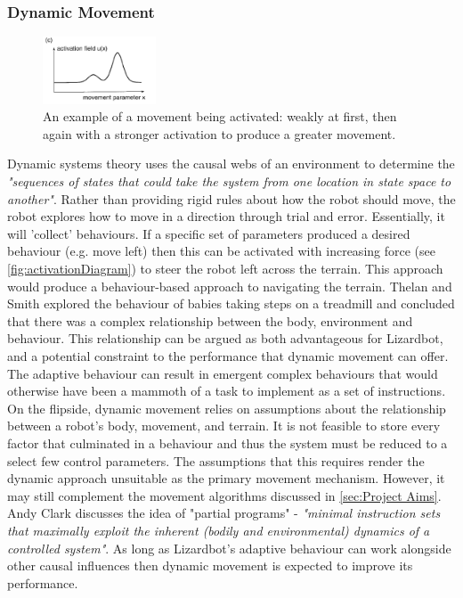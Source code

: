 \documentclass{article}
\begin{document}
\subsubsection{Dynamic Movement}
\label{sec:DST Aims}
\begin{figure}
    \centering
    \vspace*{-5mm}
    \includegraphics[width=0.3\textwidth]{activationExample}
    \caption{An example of a movement being activated: weakly at first, then again with a stronger activation to produce a greater movement. \citep{dft}}
    \label{fig:activationDiagram}
\end{figure}
Dynamic systems theory uses the causal webs of an environment to determine the \textit{"sequences of states that could take the system from one location in state space to another"}. 
Rather than providing rigid rules about how the robot should move, the robot explores how to move in a direction through trial and error. Essentially, it will 'collect' behaviours. If a specific set of parameters produced a desired behaviour (e.g. move left) then this can be activated with increasing force (see \autoref{fig:activationDiagram}) to steer the robot left across the terrain. This approach would produce a behaviour-based approach to navigating the terrain. Thelan and Smith explored the behaviour of babies taking steps on a treadmill and concluded that there was a complex relationship between the body, environment and behaviour.  This relationship can be argued as both advantageous for Lizardbot, and a potential constraint to the performance that dynamic movement can offer.\\
The adaptive behaviour can result in emergent complex behaviours that would otherwise have been a mammoth of a task to implement as a set of instructions. On the flipside, dynamic movement relies on assumptions about the relationship between a robot's body, movement, and terrain. It is not feasible to store every factor that culminated in a behaviour and thus the system must be reduced to a select few control parameters. The assumptions that this requires render the dynamic approach unsuitable as the primary movement mechanism. However, it may still complement the movement algorithms discussed in \autoref{sec:Project Aims}. Andy Clark discusses the idea of "partial programs"  - \textit{"minimal instruction sets that maximally exploit the inherent (bodily and environmental) dynamics of a controlled system"}.  As long as Lizardbot's adaptive behaviour can work alongside other causal influences then dynamic movement is expected to improve its performance.
 
\end{document}
